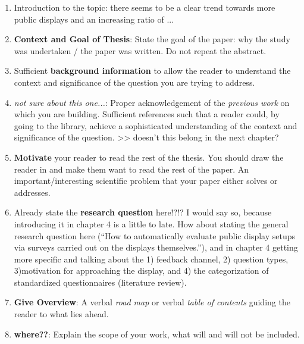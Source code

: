 	\begin{enumerate}
		\item Introduction to the topic: there seems to be a clear trend towards more public displays and an increasing ratio of ...

		\item \textbf{Context and Goal of Thesis}: State the goal of the paper: why the study was undertaken / the paper was written. Do not repeat the abstract. 

		\item Sufficient \textbf{background information} to allow the reader to understand the context and significance of the question you are trying to address. 

		\item \textit{not sure about this one...}: Proper acknowledgement of the \textit{previous work} on which you are building. Sufficient references such that a reader could, by going to the library, achieve a sophisticated understanding of the context and significance of the question.  >> doesn't this belong in the next chapter?


		\item \textbf{Motivate} your reader to read the rest of the thesis. You should draw the reader in and make them want to read the rest of the paper. An important/interesting scientific problem that your paper either solves or addresses.

		\item Already state the \textbf{research question} here!?!? I would say so, because introducing it in chapter 4 is a little to late. How about stating the general research question here (``How to automatically evaluate public display setups via surveys carried out on the displays themselves.''), and in chapter 4 getting more specific and talking about the 1) feedback channel, 2) question types, 3)motivation for approaching the display, and 4) the categorization of standardized questionnaires (literature review).



		\item \textbf{Give Overview}: A verbal \textit{road map} or verbal \textit{table of contents} guiding the reader to what lies ahead. 

		\item \textbf{where??}: Explain the scope of your work, what will and will not be included. 
	\end{enumerate}




